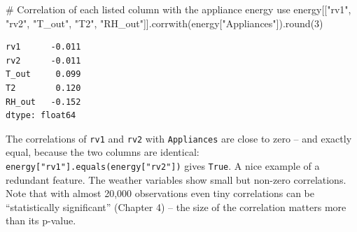 \documentclass[
  letterpaper,
  DIV=11,
  numbers=noendperiod]{scrreprt}
\newenvironment{Shaded}{\begin{snugshade}}{\end{snugshade}}
\newcommand{\BuiltInTok}[1]{\textcolor[rgb]{0.00,0.23,0.31}{#1}}
\newcommand{\CommentTok}[1]{\textcolor[rgb]{0.37,0.37,0.37}{#1}}
\newcommand{\DecValTok}[1]{\textcolor[rgb]{0.68,0.00,0.00}{#1}}
\newcommand{\NormalTok}[1]{\textcolor[rgb]{0.00,0.23,0.31}{#1}}
\newcommand{\StringTok}[1]{\textcolor[rgb]{0.13,0.47,0.30}{#1}}
\begin{document}
\begin{tcolorbox}[enhanced jigsaw, left=2mm, title=\textcolor{quarto-callout-caution-color}{\faFire}\hspace{0.5em}{Solution to Exercise 3}, opacityback=0, breakable, rightrule=.15mm, arc=.35mm, toptitle=1mm, colbacktitle=quarto-callout-caution-color!10!white, opacitybacktitle=0.6, coltitle=black, colframe=quarto-callout-caution-color-frame, bottomrule=.15mm, leftrule=.75mm, bottomtitle=1mm, titlerule=0mm, toprule=.15mm, colback=white]

\begin{Shaded}
\begin{Highlighting}[]
\CommentTok{\# Correlation of each listed column with the appliance energy use}
\NormalTok{energy[[}\StringTok{"rv1"}\NormalTok{, }\StringTok{"rv2"}\NormalTok{, }\StringTok{"T\_out"}\NormalTok{, }\StringTok{"T2"}\NormalTok{, }\StringTok{"RH\_out"}\NormalTok{]].corrwith(energy[}\StringTok{"Appliances"}\NormalTok{]).}\BuiltInTok{round}\NormalTok{(}\DecValTok{3}\NormalTok{)}
\end{Highlighting}
\end{Shaded}

\begin{verbatim}
rv1      -0.011
rv2      -0.011
T_out     0.099
T2        0.120
RH_out   -0.152
dtype: float64
\end{verbatim}

The correlations of \texttt{rv1} and \texttt{rv2} with
\texttt{Appliances} are close to zero -- and exactly equal, because the
two columns are identical:
\texttt{energy{[}"rv1"{]}.equals(energy{[}"rv2"{]})} gives
\texttt{True}. A nice example of a redundant feature. The weather
variables show small but non-zero correlations. Note that with almost
20,000 observations even tiny correlations can be ``statistically
significant'' (Chapter 4) -- the size of the correlation matters more
than its p-value.

\end{tcolorbox}
\end{document}
